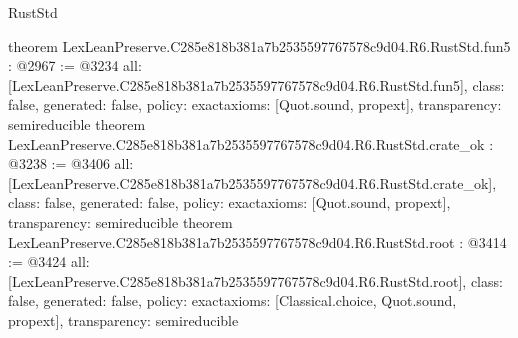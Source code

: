 \begin{lexlean}{RustStd}
\begin{coremodule}
{}
theorem LexLeanPreserve.C285e818b381a7b2535597767578c9d04.R6.RustStd.fun5 : @2967 := @3234 {
  all: [LexLeanPreserve.C285e818b381a7b2535597767578c9d04.R6.RustStd.fun5],
  class: false,
  generated: false,
  policy: exact{axioms: [Quot.sound, propext]},
  transparency: semireducible
}
theorem LexLeanPreserve.C285e818b381a7b2535597767578c9d04.R6.RustStd.crate_ok : @3238 := @3406 {
  all: [LexLeanPreserve.C285e818b381a7b2535597767578c9d04.R6.RustStd.crate_ok],
  class: false,
  generated: false,
  policy: exact{axioms: [Quot.sound, propext]},
  transparency: semireducible
}
theorem LexLeanPreserve.C285e818b381a7b2535597767578c9d04.R6.RustStd.root : @3414 := @3424 {
  all: [LexLeanPreserve.C285e818b381a7b2535597767578c9d04.R6.RustStd.root],
  class: false,
  generated: false,
  policy: exact{axioms: [Classical.choice, Quot.sound, propext]},
  transparency: semireducible
}


\end{coremodule}
\end{lexlean}
